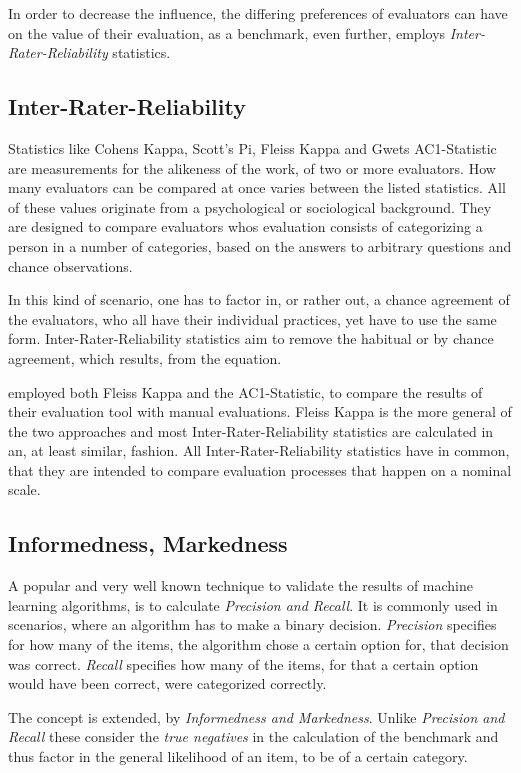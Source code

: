 In order to decrease the influence, the differing preferences of evaluators can have on 
the value of their evaluation, as a benchmark, even further, \cite{28} employs 
\textit{Inter-Rater-Reliability} statistics.



\subsection{Inter-Rater-Reliability}

Statistics like Cohens Kappa\cite{29}, Scott's Pi\cite{30}, Fleiss Kappa\cite{31} and 
Gwets AC1-Statistic \cite{32} are measurements for the alikeness of the work, of two 
or more evaluators. How many evaluators can be compared at once varies between the
listed statistics. All of these values originate from a psychological or sociological
background. They are designed to compare evaluators whos evaluation consists of 
categorizing a person in a number of categories, based on the answers to arbitrary questions
and chance observations.

In this kind of scenario, one has to factor in, or rather out, a chance agreement of the
evaluators, who all have their individual practices, yet have to use the same form. 
Inter-Rater-Reliability statistics aim to remove the habitual or by chance agreement, which
results, from the equation. 

\cite{28} employed both Fleiss Kappa and the AC1-Statistic, to compare the results of their
evaluation tool with manual evaluations. Fleiss Kappa is the more general of the two 
approaches and most Inter-Rater-Reliability statistics are calculated in an, at least similar, 
fashion. All Inter-Rater-Reliability statistics have in common, that they are intended to
compare evaluation processes that happen on a nominal scale. 



\subsection{Informedness, Markedness}

A popular and very well known technique to validate the results of machine learning algorithms,
is to calculate \textit{Precision and Recall}. It is commonly used in scenarios, where an 
algorithm has to make a binary decision. 
\textit{Precision} specifies for how many of the items, the algorithm chose a certain option for,
that decision was correct. 
\textit{Recall} specifies how many of the items, for that a certain option would have been 
correct, were categorized correctly.

The concept is extended, by \textit{Informedness and Markedness}\cite{33}. Unlike 
\textit{Precision and Recall} these consider the \textit{true negatives} in the calculation
of the benchmark and thus factor in the general likelihood of an item, to be of a certain
category.